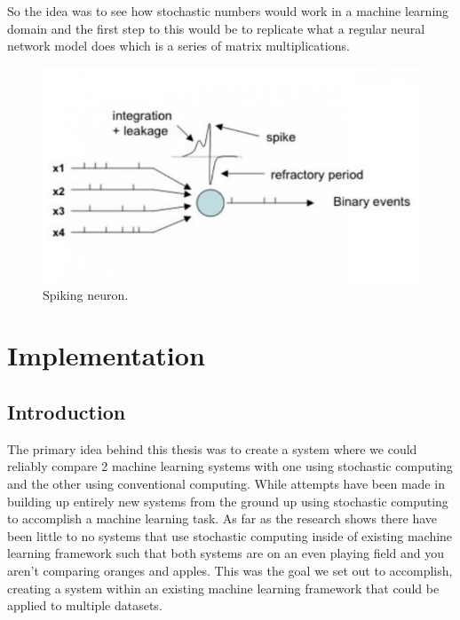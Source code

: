\documentclass[a4paper,oneside,phd,etd]{BYUPhys}
\begin{document}
So the idea was to see how stochastic numbers would work in a machine learning domain and the first step to this would be to replicate what a regular neural network model does which is a series of matrix multiplications.
\begin{figure}[H]
\centering
\includegraphics[scale=0.5]{pictures/spikingneuron.jpg}
\caption{Spiking neuron\cite{fig:spiking-neuron}.}
\label{fig:neuron_model}
\end{figure}


\chapter{Implementation}
\section{Introduction}
The primary idea behind this thesis was to create a system where we could reliably compare 2 machine learning systems with one using stochastic computing and the other using conventional computing. While attempts have been made in building up entirely new systems from the ground up using stochastic computing to accomplish a machine learning task\cite{hirtzlin2019stochastic}. As far as the research shows there have been little to no systems that use stochastic computing inside of existing machine learning framework such that both systems are on an even playing field and you aren't comparing oranges and apples. This was the goal we set out to accomplish, creating a system within an existing machine learning framework that could be applied to multiple datasets.
\end{document}
